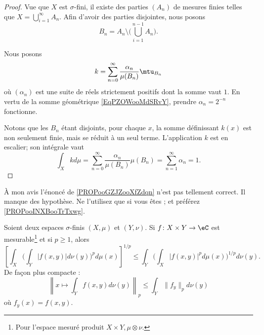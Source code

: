 \begin{proof}
	Vue que \( X\) est \( \sigma\)-fini, il existe des parties \( (A_n)\) de mesures finies telles que \( X=\bigcup_{i=1}^{\infty}A_n\). Afin d'avoir des parties disjointes, nous posons
	\begin{equation}
		B_n=A_n\setminus\big( \bigcup_{i=1}^{n-1}A_n \big).
	\end{equation}

	Nous posons
	\begin{equation}
		k=\sum_{n=0}^{\infty}\frac{ \alpha_n }{ \mu(B_n) }\mtu_{B_n}
	\end{equation}
	où \( (\alpha_n)\) est une suite de réels strictement positifs dont la somme vaut \( 1\). En vertu de la somme géométrique \eqref{EqPZOWooMdSRvY}, prendre \( \alpha_n=2^{-n}\) fonctionne.

	Notons que les \( B_n\) étant disjoints, pour chaque \( x\), la somme définissant \( k(x)\) est non seulement finie, mais se réduit à un seul terme. L'application \( k\) est en escalier; son intégrale vaut
	\begin{equation}
		\int_Xkd\mu=\sum_{n=0}^{\infty}\frac{ \alpha_n }{ \mu(B_n) }\mu(B_n)=\sum_{n=1}^{\infty}\alpha_n=1.
	\end{equation}
\end{proof}

À mon avis l'énoncé de \ref{PROPooGZJZooXfZdqn} n'est pas tellement correct. Il manque des hypothèse. Ne l'utilisez que si vous êtes ; et préférez \ref{PROPooINXBooTrTxwg}.
\begin{proposition}     \label{PROPooGZJZooXfZdqn}		%
	Soient deux espaces \( \sigma\)-finis \( (X,\mu)\) et \( (Y,\nu)\). Si \( f\colon X\times Y\to \eC\) est mesurable\footnote{Pour l'espace mesuré produit \(  X\times Y, \mu\otimes \nu\).} et si \( p\geq 1\), alors
	\begin{equation}        \label{EQooAEXWooYJtGGR}
		\left[ \int_X\Big( \int_Y| f(x,y) |d\nu(y) \Big)^pd\mu(x) \right]^{1/p}\leq \int_Y\Big( \int_X| f(x,y) |^pd\mu(x) \Big)^{1/p}d\nu(y).
	\end{equation}
	De façon plus compacte :
	\begin{equation}
		\left\|   x\mapsto\int_Y f(x,y)d\nu(y)   \right\|_p\leq \int_Y  \| f_y \|_pd\nu(y)
	\end{equation}
	où \( f_y(x)=f(x,y)\).
\end{proposition}

